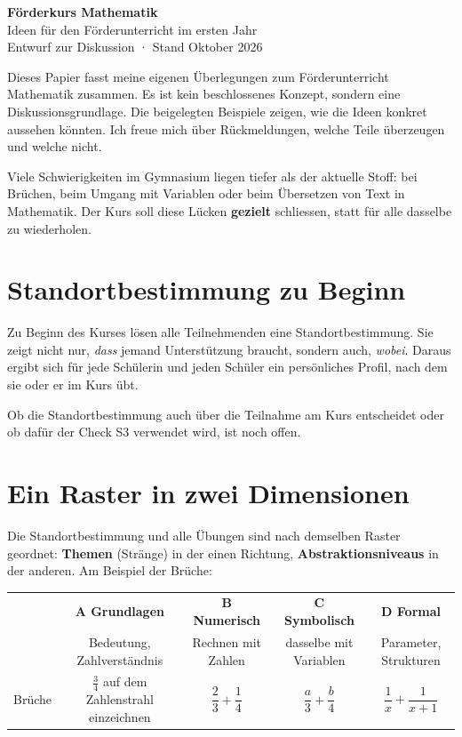 \documentclass[11pt,a4paper]{article}
\newcommand{\kurs}{Förderkurs Mathematik}
\begin{document}
\begin{center}
  {\LARGE\bfseries\color{fkblau} \kurs}\\[1ex]
  {\large Ideen für den Förderunterricht im ersten Jahr}\\[1ex]
  {\small Entwurf zur Diskussion · Stand Oktober 2026}
\end{center}

\begin{tcolorbox}[colframe=fkblau, colback=fkblau!5, boxrule=0.6pt, arc=2pt]
Dieses Papier fasst meine eigenen Überlegungen zum Förderunterricht
Mathematik zusammen. Es ist kein beschlossenes Konzept, sondern eine
Diskussionsgrundlage. Die beigelegten Beispiele zeigen, wie die Ideen konkret
aussehen könnten. Ich freue mich über Rückmeldungen, welche Teile überzeugen
und welche nicht.
\end{tcolorbox}

Viele Schwierigkeiten im Gymnasium liegen tiefer als der aktuelle Stoff: bei
Brüchen, beim Umgang mit Variablen oder beim Übersetzen von Text in
Mathematik. Der Kurs soll diese Lücken \textbf{gezielt} schliessen, statt
für alle dasselbe zu wiederholen.

\section{Standortbestimmung zu Beginn}

Zu Beginn des Kurses lösen alle Teilnehmenden eine Standortbestimmung. Sie
zeigt nicht nur, \emph{dass} jemand Unterstützung braucht, sondern auch,
\emph{wobei}. Daraus ergibt sich für jede Schülerin und jeden Schüler ein
persönliches Profil, nach dem sie oder er im Kurs übt.

Ob die Standortbestimmung auch über die Teilnahme am Kurs entscheidet oder
ob dafür der Check S3 verwendet wird, ist noch offen.

\section{Ein Raster in zwei Dimensionen}

Die Standortbestimmung und alle Übungen sind nach demselben Raster geordnet:
\textbf{Themen} (Stränge) in der einen Richtung, \textbf{Abstraktionsniveaus}
in der anderen. Am Beispiel der Brüche:

\begin{tabularx}{\textwidth}{@{}l*{4}{C}@{}}
  \toprule
  & \textbf{A Grundlagen} & \textbf{B Numerisch} & \textbf{C Symbolisch} & \textbf{D Formal} \\
  & \small Bedeutung, Zahl\-verständnis & \small Rechnen mit Zahlen
  & \small dasselbe mit Variablen & \small Parameter, Strukturen \\
  \midrule
  Brüche &
    $\frac{3}{4}$ auf dem Zahlenstrahl einzeichnen &
    $\dfrac{2}{3} + \dfrac{1}{4}$ &
    $\dfrac{a}{3} + \dfrac{b}{4}$ &
    $\dfrac{1}{x} + \dfrac{1}{x + 1}$ \\
  \bottomrule
\end{tabularx}
\end{document}
